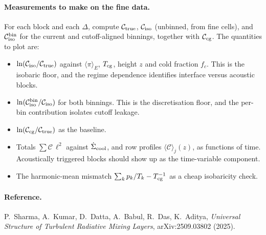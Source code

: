 \documentclass[11pt]{article}
\newcommand{\Ctrue}{\mathcal{C}_{\rm true}}
\newcommand{\Ccg}{\mathcal{C}_{\rm cg}}
\newcommand{\Ciso}{\mathcal{C}_{\rm iso}}
\newcommand{\Cbin}{\mathcal{C}_{\rm iso}^{\rm bin}}
\newcommand{\Tcg}{T_{\rm cg}}
\begin{document}
\paragraph{Measurements to make on the fine data.} For each block and each $\Delta$, compute $\Ctrue$, $\Ciso$ (unbinned, from fine cells), and $\Cbin$ for the current and cutoff-aligned binnings, together with $\Ccg$. The quantities to plot are:
\begin{itemize}
\item $\ln(\Ciso/\Ctrue)$ against $\langle\pi\rangle_E$, $\Tcg$, height $z$ and cold fraction $f_c$. This is the isobaric floor, and the regime dependence identifies interface versus acoustic blocks.
\item $\ln(\Cbin/\Ciso)$ for both binnings. This is the discretisation floor, and the per-bin contribution isolates cutoff leakage.
\item $\ln(\Ccg/\Ctrue)$ as the baseline.
\item Totals $\sum\mathcal C\,\ell^2$ against $\dot\Sigma_{\rm cool}$, and row profiles $\langle\mathcal C\rangle_j(z)$, as functions of time. Acoustically triggered blocks should show up as the time-variable component.
\item The harmonic-mean mismatch $\sum_kp_k/T_k-\Tcg^{-1}$ as a cheap isobaricity check.
\end{itemize}

\paragraph{Reference.} P.~Sharma, A.~Kumar, D.~Datta, A.~Babul, R.~Das, K.~Aditya, \emph{Universal Structure of Turbulent Radiative Mixing Layers}, arXiv:2509.03802 (2025).
\end{document}
